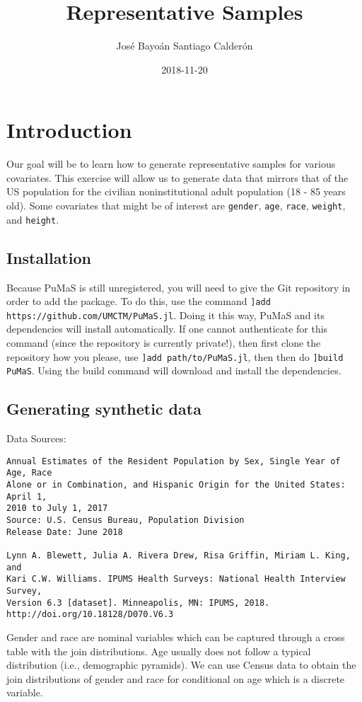 \documentclass[12pt,a4paper]{article}
\title{ Representative Samples }
\author{ José Bayoán Santiago Calderón }
\date{ 2018-11-20 }
\begin{document}
\maketitle

\section{Introduction}
Our goal will be to learn how to generate representative samples for various covariates. This exercise will allow us to generate data that mirrors that of the US population for the civilian noninstitutional adult population (18 - 85 years old). Some covariates that might be of interest are \texttt{gender}, \texttt{age}, \texttt{race}, \texttt{weight}, and \texttt{height}.

\subsection{Installation}
Because PuMaS is still unregistered, you will need to give the Git repository in order to add the package. To do this, use the command \texttt{]add https://github.com/UMCTM/PuMaS.jl}. Doing it this way, PuMaS and its dependencies will install automatically. If one cannot authenticate for this command (since the repository is currently private!), then first clone the repository how you please, use \texttt{]add path/to/PuMaS.jl}, then then do \texttt{]build PuMaS}. Using the build command will download and install the dependencies.

\subsection{Generating synthetic data}
Data Sources:

\begin{verbatim}
Annual Estimates of the Resident Population by Sex, Single Year of Age, Race
Alone or in Combination, and Hispanic Origin for the United States: April 1,
2010 to July 1, 2017
Source: U.S. Census Bureau, Population Division
Release Date: June 2018

Lynn A. Blewett, Julia A. Rivera Drew, Risa Griffin, Miriam L. King, and
Kari C.W. Williams. IPUMS Health Surveys: National Health Interview Survey,
Version 6.3 [dataset]. Minneapolis, MN: IPUMS, 2018.
http://doi.org/10.18128/D070.V6.3
\end{verbatim}
Gender and race are nominal variables which can be captured through a cross table with the join distributions. Age usually does not follow a typical distribution (i.e., demographic pyramids). We can use Census data to obtain the join distributions of gender and race for conditional on age which is a discrete variable.
\end{document}
